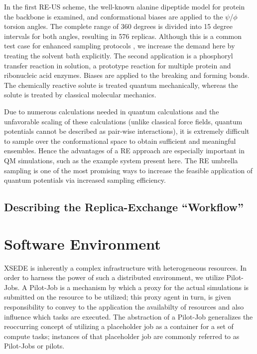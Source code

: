 \documentclass{sig-alternate}
\begin{document}
In the first RE-US scheme, the well-known alanine dipeptide model for protein the
backbone is examined, and conformational biases are applied to the $\psi$/$\phi$ torsion
angles. The complete range of 360 degrees is divided into 15 degree intervals for both
angles, resulting in 576 replicas. Although this is a common test case for enhanced
sampling protocols
, we increase the demand here by treating the solvent bath explicitly. The second
application is a phosphoryl transfer reaction in solution, a prototype reaction for
multiple protein and ribonucleic acid enzymes. Biases are applied to the breaking and
forming bonds. The chemically reactive solute is treated quantum mechanically, whereas
the solute is treated by classical molecular mechanics. 

Due to numerous calculations needed in quantum calculations and the unfavorable scaling
of these calculations (unlike classical force fields, quantum potentials cannot be
described as pair-wise interactions), it is extremely difficult to sample over the
conformational space to obtain sufficient and meaningful ensembles.  Hence the
advantages of a RE approach are especially important in QM simulations, such as the
example system present here.  The RE umbrella sampling is one of the most promising ways
to increase the feasible application of quantum potentials via increased sampling
efficiency.

\subsection{Describing the Replica-Exchange ``Workflow'' } \label{}


\section{Software Environment}

XSEDE is inherently a complex infrastructure with heterogeneous
resources. In order to harness the power of such a distributed
environment, we utilize Pilot-Jobs. A Pilot-Job is a mechanism by 
which a proxy for the actual simulations
is submitted on the resource to be utilized; this proxy agent in turn,
is given responsibility to convey to the application the availabilty
of resources and also influence which tasks are executed. The
abstraction of a Pilot-Job generalizes the reoccurring concept of
utilizing a placeholder job as a container for a set of compute tasks;
instances of that placeholder job are commonly referred to as
Pilot-Jobs or pilots. 
\end{document}
